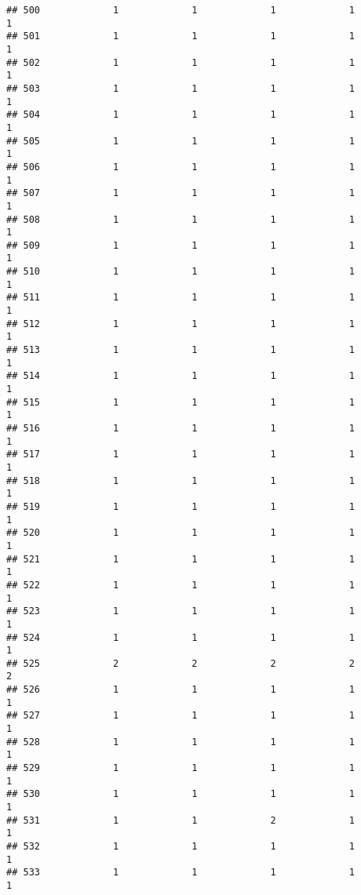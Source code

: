 \documentclass[
]{article}
\begin{document}
\begin{verbatim}
## 500             1             1             1             1             1
## 501             1             1             1             1             1
## 502             1             1             1             1             1
## 503             1             1             1             1             1
## 504             1             1             1             1             1
## 505             1             1             1             1             1
## 506             1             1             1             1             1
## 507             1             1             1             1             1
## 508             1             1             1             1             1
## 509             1             1             1             1             1
## 510             1             1             1             1             1
## 511             1             1             1             1             1
## 512             1             1             1             1             1
## 513             1             1             1             1             1
## 514             1             1             1             1             1
## 515             1             1             1             1             1
## 516             1             1             1             1             1
## 517             1             1             1             1             1
## 518             1             1             1             1             1
## 519             1             1             1             1             1
## 520             1             1             1             1             1
## 521             1             1             1             1             1
## 522             1             1             1             1             1
## 523             1             1             1             1             1
## 524             1             1             1             1             1
## 525             2             2             2             2             2
## 526             1             1             1             1             1
## 527             1             1             1             1             1
## 528             1             1             1             1             1
## 529             1             1             1             1             1
## 530             1             1             1             1             1
## 531             1             1             2             1             1
## 532             1             1             1             1             1
## 533             1             1             1             1             1

\end{verbatim}
\end{document}
